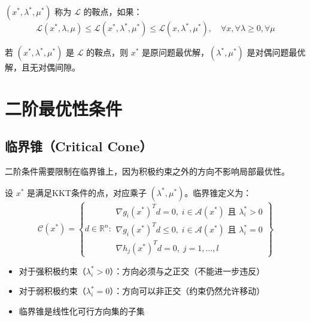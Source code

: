 \begin{definition}[鞍点]
$(x^*, \lambda^*, \mu^*)$ 称为 $\mathcal{L}$ 的鞍点，如果：
\[
\mathcal{L}(x^*, \lambda, \mu) \leq \mathcal{L}(x^*, \lambda^*, \mu^*) \leq \mathcal{L}(x, \lambda^*, \mu^*), \quad \forall x, \forall \lambda \geq 0, \forall \mu
\]
\end{definition}

\begin{theorem}[鞍点定理]
若 $(x^*, \lambda^*, \mu^*)$ 是 $\mathcal{L}$ 的鞍点，则 $x^*$ 是原问题最优解，$(\lambda^*, \mu^*)$ 是对偶问题最优解，且无对偶间隙。
\end{theorem}

\section{二阶最优性条件}\label{sec:second-order}

\subsection{临界锥（Critical Cone）}

二阶条件需要限制在临界锥上，因为积极约束之外的方向不影响局部最优性。

\begin{definition}[临界锥]
设 $x^*$ 是满足KKT条件的点，对应乘子 $(\lambda^*, \mu^*)$。临界锥定义为：
\[
\mathcal{C}(x^*) = \left\{d \in \mathbb{R}^n :
\begin{array}{l}
\nabla g_i(x^*)^T d = 0, \; i \in \mathcal{A}(x^*) \text{ 且 } \lambda_i^* > 0 \\
\nabla g_i(x^*)^T d \leq 0, \; i \in \mathcal{A}(x^*) \text{ 且 } \lambda_i^* = 0 \\
\nabla h_j(x^*)^T d = 0, \; j = 1, \ldots, l
\end{array}\right\}
\]
\end{definition}

\begin{notebox}[临界锥的含义]
\begin{itemize}
    \item 对于强积极约束（$\lambda_i^* > 0$）：方向必须与之正交（不能进一步违反）
    \item 对于弱积极约束（$\lambda_i^* = 0$）：方向可以非正交（约束仍然允许移动）
    \item 临界锥是线性化可行方向集的子集
\end{itemize}
\end{notebox}

